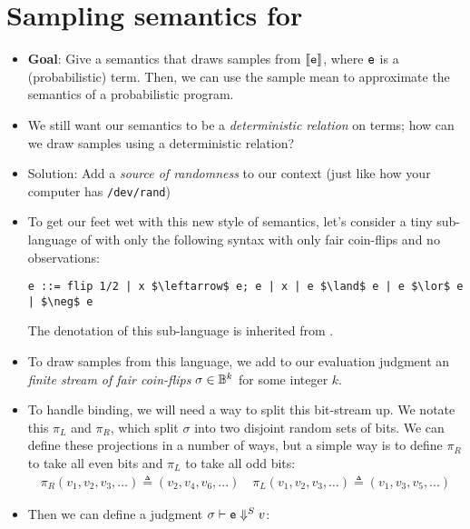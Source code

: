 \documentclass{tufte-handout}
\begin{document}
\section{Sampling semantics for \disc{}}
\begin{itemize}
  \item \textbf{Goal}: Give a semantics that draws samples from
  $\left \llbracket {\texttt{e}} \right \rrbracket$, where $\texttt{e}$ is a (probabilistic) \disc{} term. Then, we can
  use the sample mean to approximate the semantics of a probabilistic program.

  \item We still want our semantics to be a \emph{deterministic relation} on terms; how can 
  we draw samples using a deterministic relation?

  \item Solution: Add a \emph{source of randomness} to our context (just like how your 
  computer has \texttt{/dev/rand})

  \item To get our feet wet with this new style of semantics, let's consider a
  tiny sub-language of \disc{} with only the following syntax with only fair
  coin-flips and no observations:
\begin{lstlisting}[mathescape=true]
  e ::= flip 1/2 | x $\leftarrow$ e; e | x | e $\land$ e | e $\lor$ e | $\neg$ e
\end{lstlisting}

  The denotation of this sub-language is inherited from \disc{}. 

  \item To draw samples from this language, we add to our evaluation judgment an
  \emph{finite stream of fair coin-flips} $\sigma \in \mathbb{B}^{k}$ for some integer 
  $k$. 
  
  \item To handle binding, we will need a way to split this bit-stream up. We
  notate this $\pi_L$ and $\pi_R$, which split $\sigma$ into two disjoint random
  sets of bits. We can define these projections in a number of ways, but a
  simple way is to define $\pi_R$ to take all even bits and $\pi_L$ to take all
  odd bits:
  \begin{align*}
    \pi_R(v_1, v_2, v_3, \dots) \triangleq (v_2, v_4, v_6, ...) \quad 
    \pi_L(v_1, v_2, v_3, \dots) \triangleq (v_1, v_3, v_5, ...)
  \end{align*}

  \item Then we can define a judgment $\sigma \vdash \texttt{e} \Downarrow^S v$:


\end{itemize}
\end{document}
